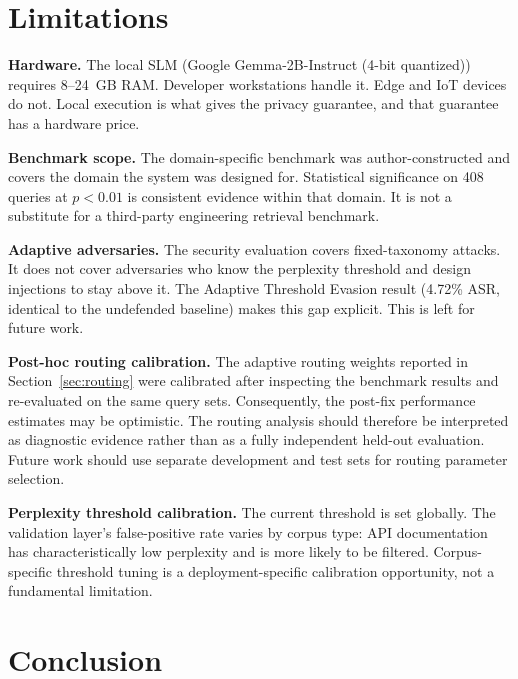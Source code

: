 \documentclass[sigconf]{acmart}
\begin{document}
\section{Limitations}
\label{sec:lim}

\textbf{Hardware.} The local SLM (Google Gemma-2B-Instruct (4-bit quantized)) requires
8--24~GB RAM. Developer workstations handle it. Edge and IoT devices do
not. Local execution is what gives the privacy guarantee, and that
guarantee has a hardware price.

\textbf{Benchmark scope.} The domain-specific benchmark was
author-constructed and covers the domain the system was designed for.
Statistical significance on 408 queries at $p < 0.01$ is consistent
evidence within that domain. It is not a substitute for a third-party
engineering retrieval benchmark.

\textbf{Adaptive adversaries.} The security evaluation covers fixed-taxonomy
attacks. It does not cover adversaries who know the perplexity threshold and
design injections to stay above it. The Adaptive Threshold Evasion result
(4.72\% ASR, identical to the undefended baseline) makes this gap explicit.
This is left for future work.

\textbf{Post-hoc routing calibration.} The adaptive routing weights
reported in Section~\ref{sec:routing} were calibrated after inspecting
the benchmark results and re-evaluated on the same query sets.
Consequently, the post-fix performance estimates may be optimistic.
The routing analysis should therefore be interpreted as diagnostic
evidence rather than as a fully independent held-out evaluation.
Future work should use separate development and test sets for routing
parameter selection.

\textbf{Perplexity threshold calibration.} The current threshold is set
globally. The validation layer's false-positive rate varies by corpus type:
API documentation has characteristically low perplexity and is more likely
to be filtered. Corpus-specific threshold tuning is a deployment-specific
calibration opportunity, not a fundamental limitation.

\section{Conclusion}
\end{document}
